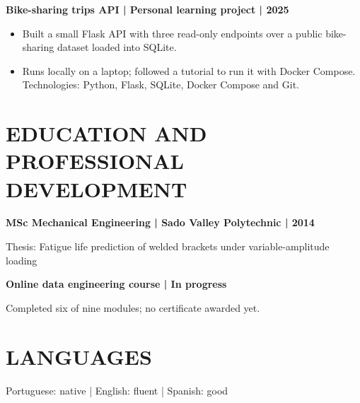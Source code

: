 \documentclass[11pt,a4paper]{article}
\newcommand{\cvsection}[1]{\section*{#1}}
\begin{document}
\textbf{Bike-sharing trips API | Personal learning project | 2025}
\begin{itemize}
\item Built a small Flask API with three read-only endpoints over a public bike-sharing dataset loaded into SQLite.
\item Runs locally on a laptop; followed a tutorial to run it with Docker Compose. Technologies: Python, Flask, SQLite, Docker Compose and Git.
\end{itemize}

\cvsection{EDUCATION AND PROFESSIONAL DEVELOPMENT}
\textbf{MSc Mechanical Engineering | Sado Valley Polytechnic | 2014}\par
Thesis: Fatigue life prediction of welded brackets under variable-amplitude loading

\textbf{Online data engineering course | In progress}\par
Completed six of nine modules; no certificate awarded yet.

\cvsection{LANGUAGES}
Portuguese: native | English: fluent | Spanish: good
\end{document}
